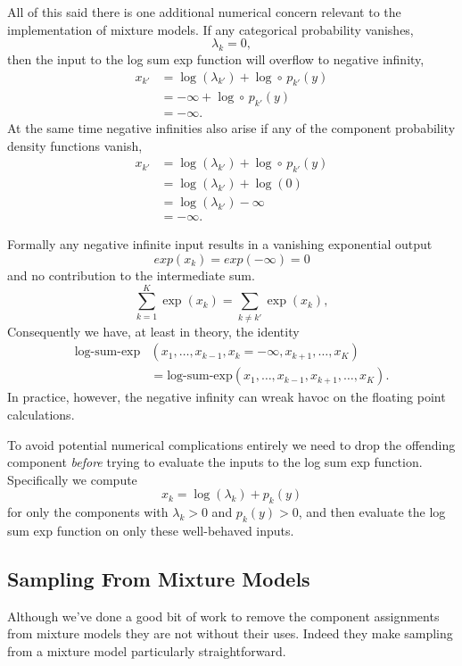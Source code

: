 \documentclass[
  letterpaper,
  DIV=11,
  numbers=noendperiod]{scrartcl}
\begin{document}
All of this said there is one additional numerical concern relevant to
the implementation of mixture models. If any categorical probability
vanishes, \[
\lambda_{k} = 0,
\] then the input to the log sum exp function will overflow to negative
infinity, \begin{align*}
x_{k'}
&=
\log(\lambda_{k'}) + \log \circ \, p_{k'}(y)
\\
&=
-\infty + \log \circ \, p_{k'}(y)
\\
&=
-\infty.
\end{align*} At the same time negative infinities also arise if any of
the component probability density functions vanish, \begin{align*}
x_{k'}
&=
\log(\lambda_{k'}) + \log \circ \, p_{k'}(y)
\\
&=
\log(\lambda_{k'}) + \log(0)
\\
&=
\log(\lambda_{k'}) -\infty
\\
&=
-\infty.
\end{align*}

Formally any negative infinite input results in a vanishing exponential
output \[
exp(x_{k}) = exp(-\infty) = 0
\] and no contribution to the intermediate sum. \[
\sum_{k = 1}^{K} \exp(x_{k}) = \sum_{k \ne k'} \exp (x_{k}),
\] Consequently we have, at least in theory, the identity \begin{align*}
\text{log-sum-exp}&(x_{1}, \ldots, x_{k - 1}, x_{k} = -\infty,
                     x_{k + 1}, \ldots, x_{K})
\\
&=
\text{log-sum-exp}(x_{1}, \ldots, x_{k - 1},
                     x_{k + 1}, \ldots, x_{K}).
\end{align*} In practice, however, the negative infinity can wreak havoc
on the floating point calculations.

To avoid potential numerical complications entirely we need to drop the
offending component \emph{before} trying to evaluate the inputs to the
log sum exp function. Specifically we compute \[
x_{k} = \log(\lambda_{k}) + p_{k}(y)
\] for only the components with \(\lambda_{k} > 0\) and
\(p_{k}(y) > 0\), and then evaluate the log sum exp function on only
these well-behaved inputs.

\subsection{Sampling From Mixture Models}\label{sec:sampling}

Although we've done a good bit of work to remove the component
assignments from mixture models they are not without their uses. Indeed
they make sampling from a mixture model particularly straightforward.
\end{document}
